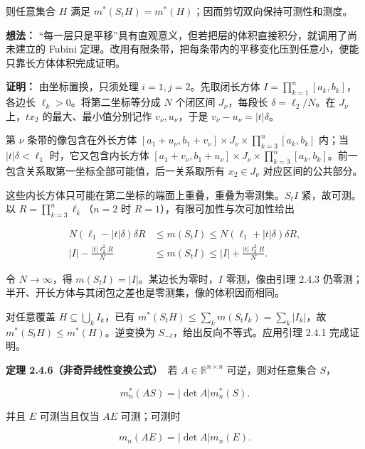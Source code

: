 \documentclass[11pt,a4paper]{article}
\begin{document}
则任意集合 \(H\) 满足
\(m^*(S_tH)=m^*(H)\)；因而剪切双向保持可测性和测度。

\textbf{想法：}
``每一层只是平移''具有直观意义，但若把层的体积直接积分，就调用了尚未建立的
Fubini
定理。改用有限条带，把每条带内的平移变化压到任意小，便能只靠长方体体积完成证明。

\textbf{证明：} 由坐标置换，只须处理 \(i=1,j=2\)。先取闭长方体
\(I=\prod_{k=1}^n[a_k,b_k]\)，各边长 \(\ell_k>0\)。将第二坐标等分成
\(N\) 个闭区间 \(J_\nu\)，每段长 \(\delta=\ell_2/N\)。在 \(J_\nu\)
上，\(tx_2\) 的最大、最小值分别记作 \(v_\nu,u_\nu\)，于是
\(v_\nu-u_\nu=|t|\delta\)。

第 \(\nu\) 条带的像包含在外长方体
\([a_1+u_\nu,b_1+v_\nu]\times J_\nu\times\prod_{k=3}^n[a_k,b_k]\) 内；当
\(|t|\delta<\ell_1\) 时，它又包含内长方体
\([a_1+v_\nu,b_1+u_\nu]\times J_\nu\times\prod_{k=3}^n[a_k,b_k]\)。前一包含关系取第一坐标全部可能值，后一关系取所有
\(x_2\in J_\nu\) 对应区间的公共部分。

这些内长方体只可能在第二坐标的端面上重叠，重叠为零测集。\(S_tI\)
紧，故可测。以 \(R=\prod_{k=3}^n\ell_k\)（\(n=2\) 时
\(R=1\)），有限可加性与次可加性给出

\begin{equation*}
\begin{aligned}
N(\ell_1-|t|\delta)\delta R
&\le m(S_tI)\le N(\ell_1+|t|\delta)\delta R,\\
|I|-\frac{|t|\ell_2^2R}{N}
&\le m(S_tI)\le |I|+\frac{|t|\ell_2^2R}{N}.
\end{aligned}
\tag{2.4.7}
\end{equation*}

令 \(N\to\infty\)，得 \(m(S_tI)=|I|\)。某边长为零时，\(I\)
零测，像由引理 2.4.3
仍零测；半开、开长方体与其闭包之差也是零测集，像的体积因而相同。

对任意覆盖 \(H\subseteq\bigcup_kI_k\)，已有
\(m^*(S_tH)\le\sum_km(S_tI_k)=\sum_k|I_k|\)，故
\(m^*(S_tH)\le m^*(H)\)。逆变换为 \(S_{-t}\)，给出反向不等式。应用引理
2.4.1 完成证明。

\textbf{定理 2.4.6（非奇异线性变换公式）}　若
\(A\in\mathbb R^{n\times n}\) 可逆，则对任意集合 \(S\)，

\begin{equation*}
m_n^*(AS)=|\det A|m_n^*(S).
\tag{2.4.8}
\end{equation*}

并且 \(E\) 可测当且仅当 \(AE\) 可测；可测时

\begin{equation*}
\boxed{m_n(AE)=|\det A|m_n(E).}
\tag{2.4.9}
\end{equation*}
\end{document}
